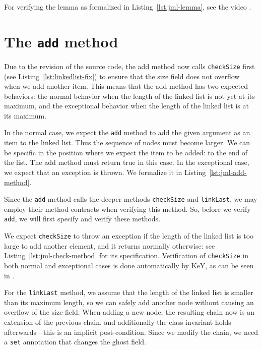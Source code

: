 \documentclass[runningheads]{llncs}
\begin{document}
For verifying the lemma as formalized in Listing~\ref{lst:jml-lemma}, see the video .

\section{The \texttt{add} method}\label{sec:add}

Due to the revision of the source code, the add method now calls \texttt{checkSize} first (see Listing~\ref{lst:linkedlist-fix}) to ensure that the size field does not overflow when we add another item. This means that the add method has two expected behaviors: the normal behavior when the length of the linked list is not yet at its maximum, and the exceptional behavior when the length of the linked list is at its maximum.

In the normal case, we expect the \texttt{add} method to add the given argument as an item to the linked list. Thus the sequence of nodes must become larger. We can be specific in the position where we expect the item to be added: to the end of the list. The add method must return true in this case. In the exceptional case, we expect that an exception is thrown. We formalize it in Listing~\ref{lst:jml-add-method}.



Since the \texttt{add} method calls the deeper methods \texttt{checkSize} and \texttt{linkLast}, we may employ their method contracts when verifying this method. So, before we verify \texttt{add}, we will first specify and verify these methods.

We expect \texttt{checkSize} to throw an exception if the length of the linked list is too large to add another element, and it returns normally otherwise: see Listing~\ref{lst:jml-check-method} for its specification. Verification of \texttt{checkSize} in both normal and exceptional cases is done automatically by KeY, as can be seen in .



For the \texttt{linkLast} method, we assume that the length of the linked list is smaller than its maximum length, so we can safely add another node without causing an overflow of the size field. When adding a new node, the resulting chain now is an extension of the previous chain, and additionally the class invariant holds afterwards---this is an implicit post-condition. Since we modify the chain, we need a \texttt{set} annotation that changes the ghost field.
\end{document}
